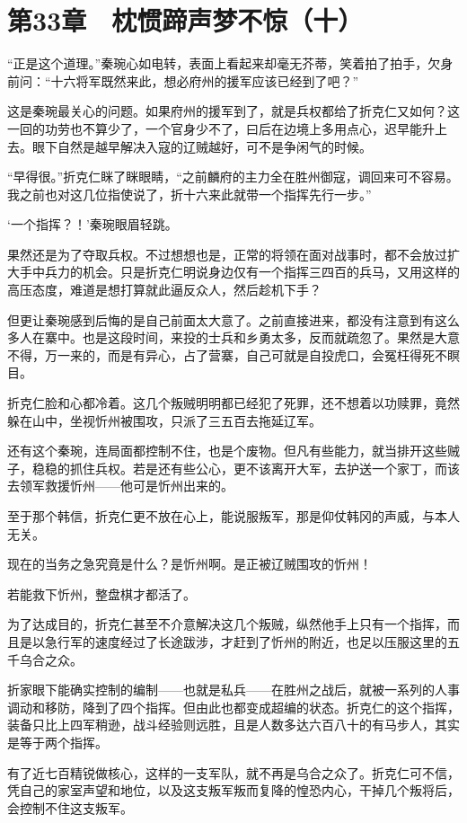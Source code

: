 \section{第33章　枕惯蹄声梦不惊（十）}

“正是这个道理。”秦琬心如电转，表面上看起来却毫无芥蒂，笑着拍了拍手，欠身前问：“十六将军既然来此，想必府州的援军应该已经到了吧？”

这是秦琬最关心的问题。如果府州的援军到了，就是兵权都给了折克仁又如何？这一回的功劳也不算少了，一个官身少不了，曰后在边境上多用点心，迟早能升上去。眼下自然是越早解决入寇的辽贼越好，可不是争闲气的时候。

“早得很。”折克仁眯了眯眼睛，“之前麟府的主力全在胜州御寇，调回来可不容易。我之前也对这几位指使说了，折十六来此就带一个指挥先行一步。”

‘一个指挥？！’秦琬眼眉轻跳。

果然还是为了夺取兵权。不过想想也是，正常的将领在面对战事时，都不会放过扩大手中兵力的机会。只是折克仁明说身边仅有一个指挥三四百的兵马，又用这样的高压态度，难道是想打算就此逼反众人，然后趁机下手？

但更让秦琬感到后悔的是自己前面太大意了。之前直接进来，都没有注意到有这么多人在寨中。也是这段时间，来投的士兵和乡勇太多，反而就疏忽了。果然是大意不得，万一来的，而是有异心，占了营寨，自己可就是自投虎口，会冤枉得死不瞑目。

折克仁脸和心都冷着。这几个叛贼明明都已经犯了死罪，还不想着以功赎罪，竟然躲在山中，坐视忻州被围攻，只派了三五百去拖延辽军。

还有这个秦琬，连局面都控制不住，也是个废物。但凡有些能力，就当排开这些贼子，稳稳的抓住兵权。若是还有些公心，更不该离开大军，去护送一个家丁，而该去领军救援忻州——他可是忻州出来的。

至于那个韩信，折克仁更不放在心上，能说服叛军，那是仰仗韩冈的声威，与本人无关。

现在的当务之急究竟是什么？是忻州啊。是正被辽贼围攻的忻州！

若能救下忻州，整盘棋才都活了。

为了达成目的，折克仁甚至不介意解决这几个叛贼，纵然他手上只有一个指挥，而且是以急行军的速度经过了长途跋涉，才赶到了忻州的附近，也足以压服这里的五千乌合之众。

折家眼下能确实控制的编制——也就是私兵——在胜州之战后，就被一系列的人事调动和移防，降到了四个指挥。但由此也都变成超编的状态。折克仁的这个指挥，装备只比上四军稍逊，战斗经验则远胜，且是人数多达六百八十的有马步人，其实是等于两个指挥。

有了近七百精锐做核心，这样的一支军队，就不再是乌合之众了。折克仁可不信，凭自己的家室声望和地位，以及这支叛军叛而复降的惶恐内心，干掉几个叛将后，会控制不住这支叛军。

